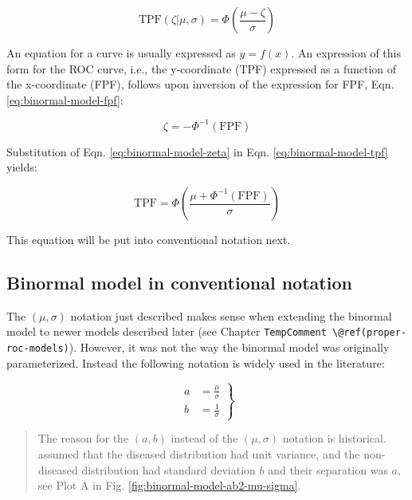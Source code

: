 \documentclass[
]{book}
\begin{document}
\begin{equation} 
\text{TPF}\left ( \zeta | \mu, \sigma \right ) = \Phi\left ( \frac{\mu-\zeta}{\sigma} \right )
\label{eq:binormal-model-tpf}
\end{equation}

An equation for a curve is usually expressed as \(y=f(x)\). An expression of this form for the ROC curve, i.e., the y-coordinate (TPF) expressed as a function of the x-coordinate (FPF), follows upon inversion of the expression for FPF, Eqn. \eqref{eq:binormal-model-fpf}:

\begin{equation} 
\zeta = -\Phi^{-1}\left ( \text{FPF} \right )
\label{eq:binormal-model-zeta}
\end{equation}

Substitution of Eqn. \eqref{eq:binormal-model-zeta} in Eqn. \eqref{eq:binormal-model-tpf} yields:

\begin{equation} 
\text{TPF} = \Phi\left ( \frac{\mu + \Phi^{-1}\left (\text{FPF}  \right )}{\sigma} \right )
\label{eq:binormal-model-roc-curve1}
\end{equation}

This equation will be put into conventional notation next.

\hypertarget{binormal-model-in-conventional-notation}{%
\subsection{Binormal model in conventional notation}\label{binormal-model-in-conventional-notation}}

The \((\mu,\sigma)\) notation just described makes sense when extending the binormal model to newer models described later (see Chapter \texttt{TempComment\ \textbackslash{}@ref(proper-roc-models)}). However, it was not the way the binormal model was originally parameterized. Instead the following notation is widely used in the literature:

\begin{equation} 
\left. 
\begin{aligned}
a&=\frac{\mu}{\sigma}\\
b&=\frac{1}{\sigma}
\end{aligned}
\right \}
\label{eq:binormal-model-ab-parameters}
\end{equation}

\begin{quote}
The reason for the \((a,b)\) instead of the \((\mu,\sigma)\) notation is historical. \citep{dorfman1969maximum} assumed that the diseased distribution had unit variance, and the non-diseased distribution had standard deviation \(b\) and their separation was \(a\), see Plot A in Fig. \ref{fig:binormal-model-ab2-mu-sigma}.
\end{quote}
\end{document}
